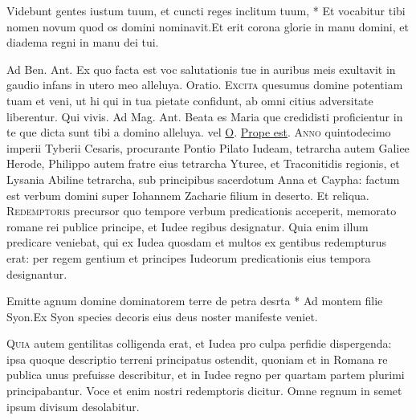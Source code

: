 \begin{multicols*}{2}
\begin{responsory-doxology}
{Videbunt gentes iustum tuum, et cuncti reges inclitum tuum, * Et vocabitur tibi nomen novum quod os domini nominavit.}{Et erit corona glorie in manu domini, et diadema regni in manu dei tui.}
\end{responsory-doxology}
{\color{Red} Ad Ben. Ant.} Ex quo facta est voc salutationis tue in auribus meis exultavit in gaudio infans in utero meo alleluya. {\color{Red} Oratio.}
\lettrine[lines=2]{\zallmancaps \color{Blue} E}{xcita} quesumus domine potentiam tuam et veni, ut hi qui in tua pietate confidunt, ab omni citius adversitate liberentur. Qui vivis. {\color{Red} Ad Mag. Ant.} Beata es Maria que credidisti proficientur in te que dicta sunt tibi a domino alleluya. {\color{Red} vel} \hyperlink{o-antiphons}{O}.
 \hyperlink{prope-est-iam-invitatorium}{Prope est}.
\lettrine[lines=2]{\zallmancaps \color{Red} A}{nno} quintodecimo imperii Tyberii Cesaris, procurante Pontio Pilato Iudeam, tetrarcha autem Galiee Herode, Philippo autem fratre eius tetrarcha Yturee, et Traconitidis regionis, et Lysania Abiline tetrarcha, sub principibus sacerdotum Anna et Caypha: factum est verbum domini super Iohannem Zacharie filium in deserto. Et reliqua.
\lettrine[lines=2]{\zallmancaps \color{Blue} R}{edemptoris} precursor quo tempore verbum predicationis acceperit, memorato romane rei publice principe, et Iudee regibus designatur. Quia enim illum predicare veniebat, qui ex Iudea quosdam et multos ex gentibus redempturus erat: per regem gentium et principes Iudeorum predicationis eius tempora designantur.
\begin{responsory}
{Emitte agnum domine dominatorem terre de petra desrta * Ad montem filie Syon.}{Ex Syon species decoris eius deus noster manifeste veniet.}
\end{responsory}
\lettrine[lines=2]{\zallmancaps \color{Red} Q}{uia} autem gentilitas colligenda erat, et Iudea pro culpa perfidie dispergenda: ipsa quoque descriptio terreni principatus ostendit, quoniam et in Romana re publica unus prefuisse describitur, et in Iudee regno per quartam partem plurimi principabantur. Voce et enim nostri redemptoris dicitur. Omne regnum in semet ipsum divisum desolabitur.

\end{multicols*}
